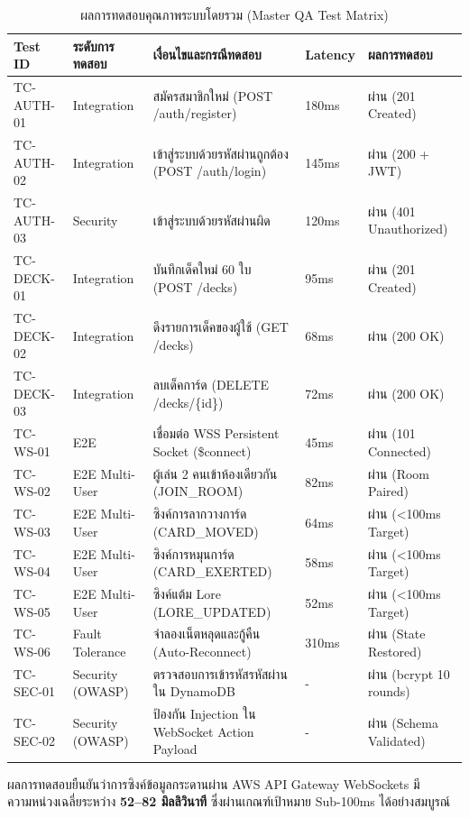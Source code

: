 \documentclass[12pt,a4paper]{report}
\begin{document}
\begin{table}[H]
\centering
\caption{ผลการทดสอบคุณภาพระบบโดยรวม (Master QA Test Matrix)}
\label{tab:qa_results}
\small
\begin{tabularx}{\textwidth}{p{1.4cm}p{2.2cm}Xp{1.5cm}p{1.5cm}}
\toprule
\textbf{Test ID} & \textbf{ระดับการทดสอบ} & \textbf{เงื่อนไขและกรณีทดสอบ} & \textbf{Latency} & \textbf{ผลการทดสอบ} \\
\midrule
TC-AUTH-01 & Integration & สมัครสมาชิกใหม่ (POST /auth/register) & 180ms & ผ่าน (201 Created) \\
TC-AUTH-02 & Integration & เข้าสู่ระบบด้วยรหัสผ่านถูกต้อง (POST /auth/login) & 145ms & ผ่าน (200 + JWT) \\
TC-AUTH-03 & Security & เข้าสู่ระบบด้วยรหัสผ่านผิด & 120ms & ผ่าน (401 Unauthorized) \\
TC-DECK-01 & Integration & บันทึกเด็คใหม่ 60 ใบ (POST /decks) & 95ms & ผ่าน (201 Created) \\
TC-DECK-02 & Integration & ดึงรายการเด็คของผู้ใช้ (GET /decks) & 68ms & ผ่าน (200 OK) \\
TC-DECK-03 & Integration & ลบเด็คการ์ด (DELETE /decks/\{id\}) & 72ms & ผ่าน (200 OK) \\
TC-WS-01 & E2E & เชื่อมต่อ WSS Persistent Socket (\$connect) & 45ms & ผ่าน (101 Connected) \\
TC-WS-02 & E2E Multi-User & ผู้เล่น 2 คนเข้าห้องเดียวกัน (JOIN\_ROOM) & 82ms & ผ่าน (Room Paired) \\
TC-WS-03 & E2E Multi-User & ซิงค์การลากวางการ์ด (CARD\_MOVED) & 64ms & ผ่าน (<100ms Target) \\
TC-WS-04 & E2E Multi-User & ซิงค์การหมุนการ์ด (CARD\_EXERTED) & 58ms & ผ่าน (<100ms Target) \\
TC-WS-05 & E2E Multi-User & ซิงค์แต้ม Lore (LORE\_UPDATED) & 52ms & ผ่าน (<100ms Target) \\
TC-WS-06 & Fault Tolerance & จำลองเน็ตหลุดและกู้คืน (Auto-Reconnect) & 310ms & ผ่าน (State Restored) \\
TC-SEC-01 & Security (OWASP) & ตรวจสอบการเข้ารหัสรหัสผ่านใน DynamoDB & - & ผ่าน (bcrypt 10 rounds) \\
TC-SEC-02 & Security (OWASP) & ป้องกัน Injection ใน WebSocket Action Payload & - & ผ่าน (Schema Validated) \\
\bottomrule
\end{tabularx}
\end{table}

ผลการทดสอบยืนยันว่าการซิงค์ข้อมูลกระดานผ่าน AWS API Gateway WebSockets มีความหน่วงเฉลี่ยระหว่าง \textbf{52--82 มิลลิวินาที} ซึ่งผ่านเกณฑ์เป้าหมาย Sub-100ms ได้อย่างสมบูรณ์
\end{document}
